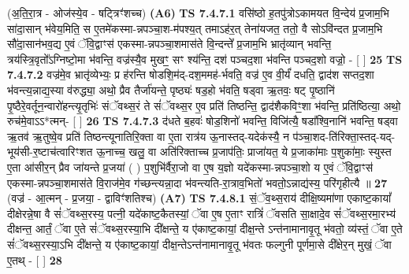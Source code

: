 \documentclass[17pt]{extarticle}
\begin{document}
                  \newline
                      (अ॒ति॒रा॒त्र - ओज॑स्ये॒व - षट्त्रिꣳ॑शच्च)  \textbf{(A6)} \newline \newline
                                        \textbf{ TS 7.4.7.1} \newline
                  वसि॑ष्ठो ह॒तपु॑त्रोऽकामयत वि॒न्देय॑ प्र॒जाम॒भि सा॑दा॒सान् भ॑वेय॒मिति॒ स ए॒तमे॑कस्मा-न्नपञ्चा॒श-म॑पश्य॒त् तमाऽह॑र॒त् तेना॑यजत॒ ततो॒ वै सोऽवि॑न्दत प्र॒जाम॒भि सौ॑दा॒सान॑भव॒द्य ए॒वं ॅवि॒द्वाꣳस॑ एकस्मा-न्नपञ्चा॒शमास॑ते वि॒न्दन्ते᳚ प्र॒जाम॒भि भ्रातृ॑व्यान् भवन्ति॒ त्रय॑स्त्रि॒वृतो᳚ऽग्निष्टो॒मा भ॑वन्ति॒ वज्र॑स्यै॒व मुखꣳ॒॒ सꣳ श्य॑न्ति॒ दश॑ पञ्चद॒शा भ॑वन्ति पञ्चद॒शो वज्रो॒ - [  ] \textbf{  25} \newline
                  \newline
                                \textbf{ TS 7.4.7.2} \newline
                  वज्र॑मे॒व भ्रातृ॑व्येभ्यः॒ प्र ह॑रन्ति षोडशि॒म॑द्-दश॒ममह॑-र्भवति॒ वज्र॑ ए॒व वी॒र्यं॑ दधति॒ द्वाद॑श सप्तद॒शा भ॑वन्त्य॒न्नाद्य॒स्या व॑रुद्ध्या॒ अथो॒ प्रैव तैर्जा॑यन्ते॒ पृष्ठ्यः॑ षड॒हो भ॑वति॒ षड्वा ऋ॒तवः॒ षट् पृ॒ष्ठानि॑ पृ॒ष्ठैरे॒वर्तून॒न्वारो॑हन्त्यृ॒तृभिः॑ संॅवथ्स॒रं ते सं॑ॅवथ्स॒र ए॒व प्रति॑ तिष्ठन्ति॒ द्वाद॑शैकविꣳ॒॒शा भ॑वन्ति॒ प्रति॑ष्ठित्या॒ अथो॒ रुच॑मे॒वाऽऽ*त्मन्- [  ] \textbf{  26} \newline
                  \newline
                                \textbf{ TS 7.4.7.3} \newline
                  द॑धते ब॒हवः॑ षोड॒शिनो॑ भवन्ति॒ विजि॑त्यै॒ षडा᳚श्वि॒नानि॑ भवन्ति॒ षड्वा ऋ॒तव॑ ऋ॒तुष्वे॒व प्रति॑ तिष्ठन्त्यूनातिरि॒क्ता वा ए॒ता रात्र॑य ऊ॒नास्तद्-यदेक॑स्यै॒ न प॑ञ्चा॒शद-ति॑रिक्ता॒स्तद्-यद्-भूय॑सी-र॒ष्टाच॑त्वारिꣳशत ऊ॒नाच्च॒ खलु॒ वा अति॑रिक्ताच्च प्र॒जाप॑तिः॒ प्राजा॑यत॒ ये प्र॒जाका॑माः प॒शुका॑माः॒ स्युस्त ए॒ता आ॑सीर॒न् प्रैव जा॑यन्ते प्र॒जया॑ ( ) प॒शुभि॑र्वैरा॒जो वा ए॒ष य॒ज्ञो यदे॑कस्मा-न्नपञ्चा॒शो य ए॒वं ॅवि॒द्वाꣳस॑ एकस्मा-न्नपञ्चा॒शमास॑ते वि॒राज॑मे॒व ग॑च्छन्त्यन्ना॒दा भ॑वन्त्यति-रा॒त्राव॒भितो॑ भवतो॒ऽन्नाद्य॑स्य॒ परि॑गृहीत्यै ॥ \textbf{  27} \newline
                  \newline
                      (वज्र॑ - आ॒त्मन् - प्र॒जया॒ - द्वाविꣳ॑शतिश्च)  \textbf{(A7)} \newline \newline
                                        \textbf{ TS 7.4.8.1} \newline
                  सं॒ॅव॒थ्स॒राय॑ दीक्षि॒ष्यमा॑णा एकाष्ट॒कायां᳚ दीक्षेरन्ने॒षा वै सं॑ॅवथ्स॒रस्य॒ पत्नी॒ यदे॑काष्ट॒कैतस्यां॒ ॅवा ए॒ष ए॒ताꣳ रात्रिं॑ ॅवसति सा॒क्षादे॒व सं॑ॅवथ्स॒रमा॒रभ्य॑ दीक्षन्त॒ आर्तं॒ ॅवा ए॒ते सं॑ॅवथ्स॒रस्या॒भि दी᳚क्षन्ते॒ य ए॑काष्ट॒कायां॒ दीक्ष॒न्ते ऽन्त॑नामानावृ॒तू भ॑वतो॒ व्य॑स्तं॒ ॅवा ए॒ते सं॑ॅवथ्स॒रस्या॒ऽभि दी᳚क्षन्ते॒ य ए॑काष्ट॒कायां॒ दीक्ष॒न्तेऽन्त॑नामानावृ॒तू भ॑वतः फल्गुनी पूर्णमा॒से दी᳚क्षेर॒न् मुखं॒ ॅवा ए॒तथ् - [  ] \textbf{  28} \newline
\end{document}
